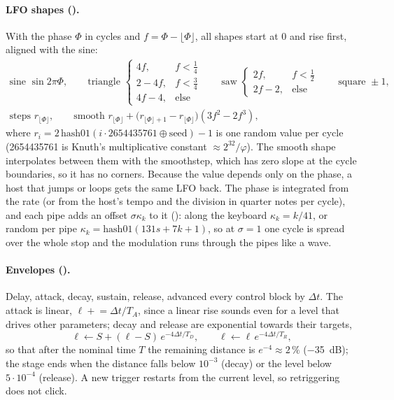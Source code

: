 \paragraph{LFO shapes ().} With the phase $\Phi$ in cycles and $f = \Phi - \lfloor\Phi\rfloor$, all shapes
start at 0 and rise first, aligned with the sine:
\begin{gather}
  \text{sine } \sin 2\pi\Phi,\qquad
  \text{triangle } \begin{cases}4f, & f<\tfrac14\\2-4f, & f<\tfrac34\\4f-4, & \text{else}\end{cases}\qquad
  \text{saw } \begin{cases}2f, & f<\tfrac12\\2f-2, & \text{else}\end{cases}\qquad
  \text{square } \pm1,\\
  \text{steps } r_{\lfloor\Phi\rfloor},\qquad
  \text{smooth } r_{\lfloor\Phi\rfloor} + \bigl(r_{\lfloor\Phi\rfloor+1}-r_{\lfloor\Phi\rfloor}\bigr)(3f^2-2f^3),
\end{gather}
where $r_i = 2\,\mathrm{hash01}(i\cdot2654435761 \oplus \text{seed})-1$ is one random value per cycle (2654435761 is
Knuth's multiplicative constant $\approx 2^{32}/\varphi$). The smooth shape interpolates between them with the smoothstep,
which has zero slope at the cycle boundaries, so it has no corners. Because the value depends only on the phase, a
host that jumps or loops gets the same LFO back. The phase is integrated from the rate (or from the host's tempo and the
division in quarter notes per cycle), and each pipe adds an offset $\sigma\kappa_k$ to it (): along the
keyboard $\kappa_k = k/41$, or random per pipe $\kappa_k = \mathrm{hash01}(131s + 7k + 1)$, so at $\sigma = 1$ one cycle
is spread over the whole stop and the modulation runs through the pipes like a wave.

\paragraph{Envelopes ().} Delay, attack, decay, sustain, release, advanced every control block by $\Delta t$.
The attack is linear, $\ell \mathrel{+}= \Delta t/T_A$, since a linear rise sounds even for a level that drives other
parameters; decay and release are exponential towards their targets,
\begin{equation}
  \ell \leftarrow S + (\ell - S)\,e^{-4\Delta t/T_D},\qquad \ell \leftarrow \ell\, e^{-4\Delta t/T_R},
\end{equation}
so that after the nominal time $T$ the remaining distance is $e^{-4}\approx 2\,\%$ (\SI{-35}{dB}); the stage ends when the
distance falls below $10^{-3}$ (decay) or the level below $5\cdot10^{-4}$ (release). A new trigger restarts from the
current level, so retriggering does not click.

